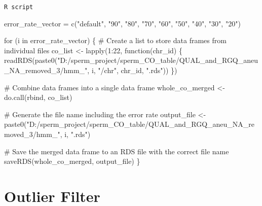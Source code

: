 \documentclass[
  letterpaper,
  DIV=11,
  numbers=noendperiod]{scrreprt}
\newenvironment{Shaded}{\begin{snugshade}}{\end{snugshade}}
\newcommand{\CommentTok}[1]{\textcolor[rgb]{0.37,0.37,0.37}{#1}}
\newcommand{\ControlFlowTok}[1]{\textcolor[rgb]{0.00,0.23,0.31}{#1}}
\newcommand{\DecValTok}[1]{\textcolor[rgb]{0.68,0.00,0.00}{#1}}
\newcommand{\FunctionTok}[1]{\textcolor[rgb]{0.28,0.35,0.67}{#1}}
\newcommand{\NormalTok}[1]{\textcolor[rgb]{0.00,0.23,0.31}{#1}}
\newcommand{\OtherTok}[1]{\textcolor[rgb]{0.00,0.23,0.31}{#1}}
\newcommand{\SpecialCharTok}[1]{\textcolor[rgb]{0.37,0.37,0.37}{#1}}
\newcommand{\StringTok}[1]{\textcolor[rgb]{0.13,0.47,0.30}{#1}}
\begin{document}
\begin{codelisting}

\caption{\texttt{R script}}

\begin{Shaded}
\begin{Highlighting}[]
\NormalTok{error\_rate\_vector }\OtherTok{=} \FunctionTok{c}\NormalTok{(}\StringTok{"default"}\NormalTok{, }\StringTok{"90"}\NormalTok{, }\StringTok{"80"}\NormalTok{, }\StringTok{"70"}\NormalTok{, }\StringTok{"60"}\NormalTok{, }\StringTok{"50"}\NormalTok{, }\StringTok{"40"}\NormalTok{, }\StringTok{"30"}\NormalTok{, }\StringTok{"20"}\NormalTok{)}

\ControlFlowTok{for}\NormalTok{ (i }\ControlFlowTok{in}\NormalTok{ error\_rate\_vector) \{}
  \CommentTok{\# Create a list to store data frames from individual files}
\NormalTok{  co\_list }\OtherTok{\textless{}{-}} \FunctionTok{lapply}\NormalTok{(}\DecValTok{1}\SpecialCharTok{:}\DecValTok{22}\NormalTok{, }\ControlFlowTok{function}\NormalTok{(chr\_id) \{}
    \FunctionTok{readRDS}\NormalTok{(}\FunctionTok{paste0}\NormalTok{(}\StringTok{"D:/sperm\_project/sperm\_CO\_table/QUAL\_and\_RGQ\_aneu\_NA\_removed\_3/hmm\_"}\NormalTok{, i, }\StringTok{"/chr"}\NormalTok{, chr\_id, }\StringTok{".rds"}\NormalTok{))}
\NormalTok{    \})}
  
  \CommentTok{\# Combine data frames into a single data frame}
\NormalTok{  whole\_co\_merged }\OtherTok{\textless{}{-}} \FunctionTok{do.call}\NormalTok{(rbind, co\_list)}
  
  \CommentTok{\# Generate the file name including the error rate}
\NormalTok{  output\_file }\OtherTok{\textless{}{-}} \FunctionTok{paste0}\NormalTok{(}\StringTok{"D:/sperm\_project/sperm\_CO\_table/QUAL\_and\_RGQ\_aneu\_NA\_removed\_3/hmm\_"}\NormalTok{, i, }\StringTok{".rds"}\NormalTok{)}
  
  \CommentTok{\# Save the merged data frame to an RDS file with the correct file name}
  \FunctionTok{saveRDS}\NormalTok{(whole\_co\_merged, output\_file)}
\NormalTok{\}}
\end{Highlighting}
\end{Shaded}

\end{codelisting}

\hypertarget{outlier-filter}{%
\section{Outlier Filter}\label{outlier-filter}}
\end{document}
